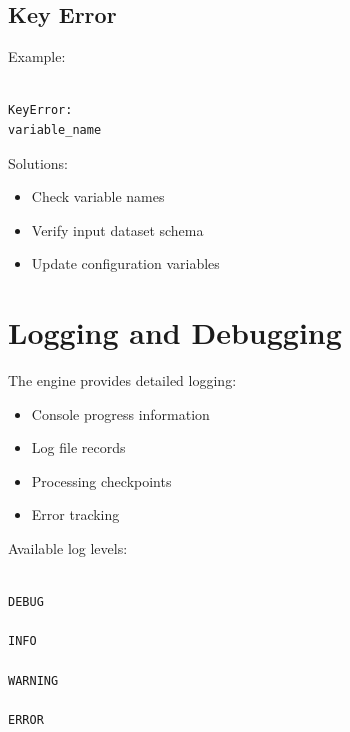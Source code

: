 \documentclass[11pt,a4paper]{article}
\begin{document}
\subsection{Key Error}



Example:


\begin{verbatim}

KeyError:
variable_name

\end{verbatim}



Solutions:


\begin{itemize}

\item Check variable names

\item Verify input dataset schema

\item Update configuration variables

\end{itemize}





\section{Logging and Debugging}



The engine provides detailed logging:



\begin{itemize}

\item Console progress information

\item Log file records

\item Processing checkpoints

\item Error tracking

\end{itemize}



Available log levels:



\begin{verbatim}

DEBUG

INFO

WARNING

ERROR

\end{verbatim}
\end{document}
